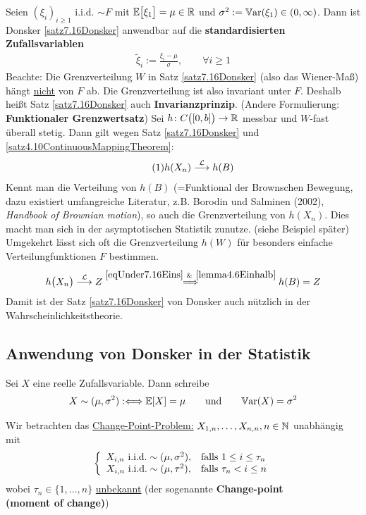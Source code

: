 Seien $(\xi_i)_{i\geq1}$ i.i.d. $\sim F$ mit $\mathbb{E}\big[\xi_1\big]=\mu\in\mathbb{R}$ und $\sigma^2:=\mathbb{V}\text{ar}(\xi_1)\in(0,\infty)$. Dann ist Donsker \ref{satz7.16Donsker} anwendbar auf die \textbf{standardisierten Zufallsvariablen}
\begin{align*}
\tilde{\xi}_i:=\frac{\xi_i-\mu}{\sigma},\qquad\forall i\geq1
\end{align*}
Beachte: Die Grenzverteilung $W$ in Satz \ref{satz7.16Donsker} (also das Wiener-Maß) hängt \ul{nicht} von $F$ ab. Die Grenzverteilung ist also invariant unter $F$. Deshalb heißt Satz \ref{satz7.16Donsker} auch \textbf{Invarianzprinzip}. (Andere Formulierung: \textbf{Funktionaler Grenzwertsatz})\nl
Sei $h\colon C\big([0,b]\big)\to\mathbb{R}$ messbar und $W$-fast überall stetig. Dann gilt wegen Satz \ref{satz7.16Donsker} und \ref{satz4.10ContinuousMappingTheorem}:
\begin{align}\label{eqUnder7.16Eins}\tag{1}
h(X_n)\stackrel{\mathcal{L}}{\longrightarrow} h(B)
\end{align}
Kennt man die Verteilung von $h(B)$ (=Funktional der Brownschen Bewegung, dazu existiert umfangreiche Literatur, z.B. Borodin und Salminen (2002), \textit{Handbook of Brownian motion}), so auch die Grenzverteilung von $h(X_n)$. Dies macht man sich in der asymptotischen Statistik zunutze. (siehe Beispiel später) Umgekehrt lässt sich oft die Grenzverteilung $h(W)$ für besonders einfache Verteilungfunktionen $F$ bestimmen.
\begin{align*}
h\big(X_n\big)\stackrel{\mathcal{L}}{\longrightarrow}Z
\overset{\eqref{eqUnder7.16Eins}~\&~\ref{lemma4.6Einhalb}}{\implies}
h(B)=Z
\end{align*}
Damit ist der Satz \ref{satz7.16Donsker} von Donsker auch nützlich in der Wahrscheinlichkeitstheorie.

\subsection{Anwendung von Donsker in der Statistik}
\begin{notation}
Sei $X$ eine reelle Zufallsvariable. Dann schreibe
\begin{align*}
X\sim(\mu,\sigma^2):\Longleftrightarrow\mathbb{E}[X]=\mu\qquad\text{und}\qquad\mathbb{V}\text{ar}(X)=\sigma^2
\end{align*}
\end{notation}

Wir betrachten das \underline{Change-Point-Problem:}
$X_{1,n},\ldots,X_{n,n},n\in\mathbb{N}$ unabhängig mit 
\begin{align*}
\left\lbrace\begin{array}{cl}
X_{i,n}\text{ i.i.d.}\sim(\mu,\sigma^2), &\text{falls } 1\leq i\leq\tau_n\\
X_{i,n}\text{ i.i.d.}\sim(\mu,\tau^2), &\text{falls } \tau_n< i\leq n
\end{array}\right.
\end{align*}
wobei $\tau_n\in\lbrace1,\ldots,n\rbrace$ \ul{unbekannt} (der sogenannte \textbf{Change-point\\ (moment of change)}) 

